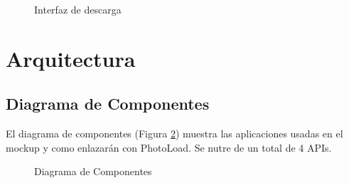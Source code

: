 \documentclass{scrartcl}
\begin{document}
\begin{figure}[H]
	
	\centering
	\caption{Interfaz de descarga}
	\label{fig:VistaDescarga}
	
\end{figure}
\vspace*{2in}
\section{Arquitectura}

\subsection{Diagrama de Componentes}
El diagrama de componentes (Figura \ref{fig:DiagramaComponentes}) muestra las aplicaciones usadas en el mockup y como enlazarán con PhotoLoad. Se nutre de un total de 4 APIs.

\begin{figure}[H]
	
	\centering
	\caption{Diagrama de Componentes}
	\label{fig:DiagramaComponentes}
	
\end{figure}
\end{document}
